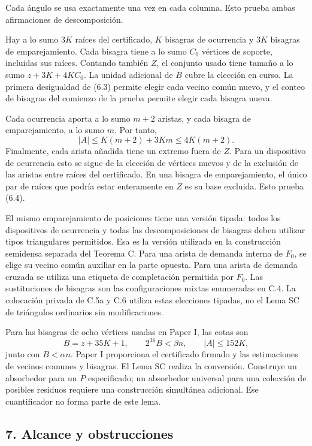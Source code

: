 \documentclass[spanish,11pt,a4paper]{article}
\begin{document}
Cada ángulo se usa exactamente una vez en cada columna. Esto prueba ambas afirmaciones de descomposición.

Hay a lo sumo \(3K\) raíces del certificado, \(K\) bisagras de ocurrencia y \(3K\) bisagras de emparejamiento. Cada bisagra tiene a lo sumo \(C_0\) vértices de soporte, incluidas sus raíces. Contando también \(Z\), el conjunto usado tiene tamaño a lo sumo \(z+3K+4KC_0\). La unidad adicional de \(B\) cubre la elección en curso. La primera desigualdad de (6.3) permite elegir cada vecino común nuevo, y el conteo de bisagras del comienzo de la prueba permite elegir cada bisagra nueva.

Cada ocurrencia aporta a lo sumo \(m+2\) aristas, y cada bisagra de emparejamiento, a lo sumo \(m\). Por tanto, \[|A|\le K(m+2)+3Km\le4K(m+2).\] Finalmente, cada arista añadida tiene un extremo fuera de \(Z\). Para un dispositivo de ocurrencia esto se sigue de la elección de vértices nuevos y de la exclusión de las aristas entre raíces del certificado. En una bisagra de emparejamiento, el único par de raíces que podría estar enteramente en \(Z\) es su base excluida. Esto prueba (6.4).

El mismo emparejamiento de posiciones tiene una versión tipada: todos los dispositivos de ocurrencia y todas las descomposiciones de bisagras deben utilizar tipos triangulares permitidos. Esa es la versión utilizada en la construcción semidensa separada del Teorema C. Para una arista de demanda interna de \(F_0\), se elige su vecino común auxiliar en la parte opuesta. Para una arista de demanda cruzada se utiliza una etiqueta de completación permitida por \(F_0\). Las sustituciones de bisagras son las configuraciones mixtas enumeradas en C.4. La colocación privada de C.5a y C.6 utiliza estas elecciones tipadas, no el Lema SC de triángulos ordinarios sin modificaciones.

Para las bisagras de ocho vértices usadas en Paper I, las cotas son \[B=z+35K+1,\qquad 2^{36}B<\beta n,\qquad |A|\le152K,
\tag{6.7}\] junto con \(B<\alpha n\). Paper I proporciona el certificado firmado y las estimaciones de vecinos comunes y bisagras. El Lema SC realiza la conversión. Construye un absorbedor para un \(P\) especificado; un absorbedor universal para una colección de posibles residuos requiere una construcción simultánea adicional. Ese cuantificador no forma parte de este lema.


\subsection{7. Alcance y obstrucciones}\label{alcance-y-obstrucciones}
\end{document}
